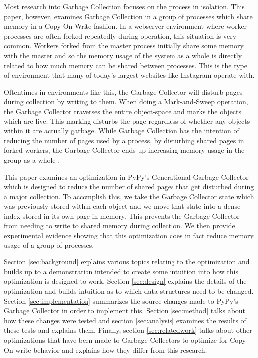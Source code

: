 \documentclass{article}
\begin{document}
\begin{sloppypar}
Most research into Garbage Collection focuses on the process in isolation.  This paper, however, examines Garbage Collection in a group of processes which share memory in a Copy-On-Write fashion.  In a webserver environment where worker processes are often forked repeatedly during operation, this situation is very common.  Workers forked from the master process initially share some memory with the master and so the memory usage of the system as a whole is directly related to how much memory can be shared between processes.  This is the type of environment that many of today's largest websites like Instagram operate with\cite{dismissing_garbage}.

Oftentimes in environments like this, the Garbage Collector will disturb pages during collection by writing to them.  When doing a Mark-and-Sweep operation, the Garbage Collector traverses the entire object-space and marks the objects which are live.  This marking disturbs the page regardless of whether any objects within it are actually garbage.  While Garbage Collection has the intention of reducing the number of pages used by a process, by disturbing shared pages in forked workers, the Garbage Collector ends up increasing memory usage in the group as a whole \cite{dismissing_garbage}.  

This paper examines an optimization in PyPy's Generational Garbage Collector\cite{pypy-doc} which is designed to reduce the number of shared pages that get disturbed during a major collection.  To accomplish this, we take the Garbage Collector state which was previously stored within each object and we move that state into a dense index stored in its own page in memory.  This prevents the Garbage Collector from needing to write to shared memory during collection.  We then provide experimental evidence showing that this optimization does in fact reduce memory usage of a group of processes.  

Section \ref{sec:background} explains various topics relating to the optimization and builds up to a demonstration intended to create some intuition into how this optimization is designed to work.  Section \ref{sec:design} explains the details of the optimization and builds intuition as to which data structures need to be changed.  Section \ref{sec:implementation} summarizes the source changes made to PyPy's Garbage Collector in order to implement this.  Section \ref{sec:method} talks about how these changes were tested and section \ref{sec:analysis} examines the results of these tests and explains them.  Finally, section \ref{sec:relatedwork} talks about other optimizations that have been made to Garbage Collectors to optimize for Copy-On-write behavior and explains how they differ from this research.  


\end{sloppypar}
\end{document}
